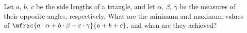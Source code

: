 Let $a$, $b$, $c$ be the side lengths of a triangle,
and let $\alpha$, $\beta$, $\gamma$ be the measures of their opposite angles, respectively.
What are the minimum and maximum values of
$\mfrac{a \cdot \alpha + b \cdot \beta + c \cdot \gamma}{a + b + c}$,
and when are they achieved?
